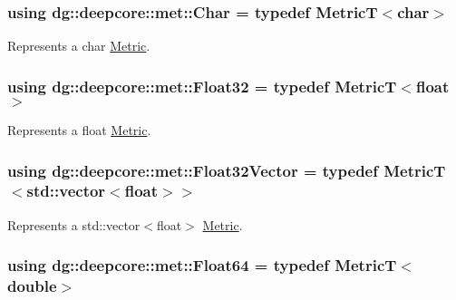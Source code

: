 \subsubsection[{\texorpdfstring{Char}{Char}}]{\setlength{\rightskip}{0pt plus 5cm}using {\bf dg\+::deepcore\+::met\+::\+Char} = typedef MetricT$<$char$>$}\hypertarget{group___process_metrics_ga3689c12dcf2ea830e912ac1dc4c504ce}{}\label{group___process_metrics_ga3689c12dcf2ea830e912ac1dc4c504ce}


Represents a {\ttfamily char} \hyperlink{classdg_1_1deepcore_1_1_metric}{Metric}. 

\subsubsection[{\texorpdfstring{Float32}{Float32}}]{\setlength{\rightskip}{0pt plus 5cm}using {\bf dg\+::deepcore\+::met\+::\+Float32} = typedef MetricT$<$float$>$}\hypertarget{group___process_metrics_gaee2fce12beb02ae0debbf3cefa36233c}{}\label{group___process_metrics_gaee2fce12beb02ae0debbf3cefa36233c}


Represents a {\ttfamily float} \hyperlink{classdg_1_1deepcore_1_1_metric}{Metric}. 

\subsubsection[{\texorpdfstring{Float32\+Vector}{Float32Vector}}]{\setlength{\rightskip}{0pt plus 5cm}using {\bf dg\+::deepcore\+::met\+::\+Float32\+Vector} = typedef MetricT$<$std\+::vector$<$float$>$$>$}\hypertarget{group___process_metrics_gae14eba8bf601ac77a15bd03607090d68}{}\label{group___process_metrics_gae14eba8bf601ac77a15bd03607090d68}


Represents a {\ttfamily std\+::vector$<$float$>$} \hyperlink{classdg_1_1deepcore_1_1_metric}{Metric}. 

\subsubsection[{\texorpdfstring{Float64}{Float64}}]{\setlength{\rightskip}{0pt plus 5cm}using {\bf dg\+::deepcore\+::met\+::\+Float64} = typedef MetricT$<$double$>$}\hypertarget{group___process_metrics_gaaab936172e4530d446a0701884c45462}{}\label{group___process_metrics_gaaab936172e4530d446a0701884c45462}


